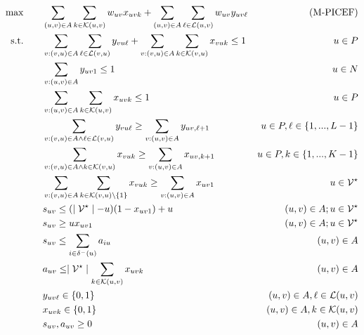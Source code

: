 \documentclass{article}
\begin{document}
\begin{subequations}
	\begin{align}
		\max \qquad & \sum_{(u,v) \in A}\sum_{k \in \mathcal{K}(u,v)} w_{uv}x_{uvk} + \sum_{(u,v) \in A}\sum_{\ell \in \mathcal{L}(u,v)} w_{uv}y_{uv\ell}&
		\label{eq:objAB} \tag{M-PICEF}\\
		\text{s.t.}\qquad
		&\sum_{v: (v,u) \in A}\sum_{\ell \in \mathcal{L}(v,u)} y_{vu\ell} + \sum_{v: (v,u) \in A}\sum_{k \in \mathcal{K}(v,u)} x_{vuk} \le 1 & u \in P \label{eq:inflow}\\
		&\sum_{v: (u,v) \in A} y_{uv1} \le 1& u \in N \label{eq:firstarcch}\\
		&\sum_{v: (u,v) \in A} \sum_{k \in \mathcal{K}(u,v)} x_{uvk} \le 1 & u \in P \label{eq:firstarccy}\\
		&\sum_{v: (v,u) \in A \wedge \ell \in \mathcal{L}(v,u)} y_{vu\ell} \ge \sum_{v: (u,v) \in A} y_{uv,\ell+1}& u \in P, \ell \in \{1,...,L-1\} \label{eq:onetonextch}\\
		&\sum_{v: (v,u) \in A \wedge k \in \mathcal{K}(v,u)} x_{vuk} \ge \sum_{v: (u,v) \in A} x_{uv,k+1}& u \in P, k \in \{1,...,K - 1\} \label{eq:onetonextcy}\\
		&\sum_{v:(v,u) \in A} \sum_{k \in \mathcal{K}(v,u) \setminus \{1\}} x_{vuk} \ge \sum_{v:(u,v) \in A}   x_{uv1} & u \in \mathcal{V}^{\star} \label{eq:starttonextcy}\\
		&s_{uv} \le (\mid \mathcal{V}^{\star} \mid - u)(1 -  x_{uv1}) +  u& (u,v) \in A; u \in \mathcal{V}^{\star}\\
		&s_{uv} \ge u x_{uv1} & (u,v) \in A; u \in \mathcal{V}^{\star}\\
		&s_{uv} \le \sum_{i \in \delta^{-}(u)} a_{i u} & (u,v) \in A\\
		&a_{uv} \le \mid \mathcal{V}^{\star} \mid \sum_{k \in \mathcal{K}(u,v)} x_{uvk}& (u,v) \in A\\
		&y_{uv\ell} \in \{0,1\}& (u,v) \in A, \ell \in \mathcal{L}(u,v)\\
		&x_{uvk} \in \{0,1\}& (u,v) \in A, k \in \mathcal{K}(u,v)\\
		&s_{uv}, a_{uv} \ge 0 & (u,v) \in A
\end{align}
\end{subequations}
\end{document}

